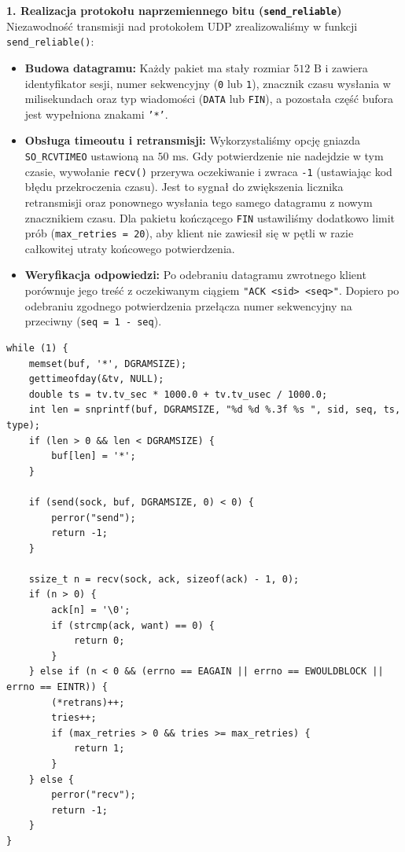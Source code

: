 \documentclass[12pt,a4paper]{article}
\begin{document}
\noindent \textbf{1. Realizacja protokołu naprzemiennego bitu (\texttt{send\_reliable})} \\
Niezawodność transmisji nad protokołem UDP zrealizowaliśmy w funkcji \texttt{send\_reliable()}:
\begin{itemize}
    \item \textbf{Budowa datagramu:} Każdy pakiet ma stały rozmiar $512\text{ B}$ i zawiera identyfikator sesji, numer sekwencyjny (\texttt{0} lub \texttt{1}), znacznik czasu wysłania w milisekundach oraz typ wiadomości (\texttt{DATA} lub \texttt{FIN}), a pozostała część bufora jest wypełniona znakami \texttt{'*'}.
    \item \textbf{Obsługa timeoutu i retransmisji:} Wykorzystaliśmy opcję gniazda \texttt{SO\_RCVTIMEO} ustawioną na $50\text{ ms}$. Gdy potwierdzenie nie nadejdzie w tym czasie, wywołanie \texttt{recv()} przerywa oczekiwanie i zwraca \texttt{-1} (ustawiając kod błędu przekroczenia czasu). Jest to sygnał do zwiększenia licznika retransmisji oraz ponownego wysłania tego samego datagramu z nowym znacznikiem czasu. Dla pakietu kończącego \texttt{FIN} ustawiliśmy dodatkowo limit prób (\texttt{max\_retries = 20}), aby klient nie zawiesił się w pętli w razie całkowitej utraty końcowego potwierdzenia.
    \item \textbf{Weryfikacja odpowiedzi:} Po odebraniu datagramu zwrotnego klient porównuje jego treść z oczekiwanym ciągiem \texttt{"ACK <sid> <seq>"}. Dopiero po odebraniu zgodnego potwierdzenia przełącza numer sekwencyjny na przeciwny (\texttt{seq = 1 - seq}).
\end{itemize}

\begin{lstlisting}
while (1) {
    memset(buf, '*', DGRAMSIZE);
    gettimeofday(&tv, NULL);
    double ts = tv.tv_sec * 1000.0 + tv.tv_usec / 1000.0;
    int len = snprintf(buf, DGRAMSIZE, "%d %d %.3f %s ", sid, seq, ts, type);
    if (len > 0 && len < DGRAMSIZE) {
        buf[len] = '*';
    }

    if (send(sock, buf, DGRAMSIZE, 0) < 0) {
        perror("send");
        return -1;
    }

    ssize_t n = recv(sock, ack, sizeof(ack) - 1, 0);
    if (n > 0) {
        ack[n] = '\0';
        if (strcmp(ack, want) == 0) {
            return 0;
        }
    } else if (n < 0 && (errno == EAGAIN || errno == EWOULDBLOCK || errno == EINTR)) {
        (*retrans)++;
        tries++;
        if (max_retries > 0 && tries >= max_retries) {
            return 1;
        }
    } else {
        perror("recv");
        return -1;
    }
}
\end{lstlisting}
\end{document}
